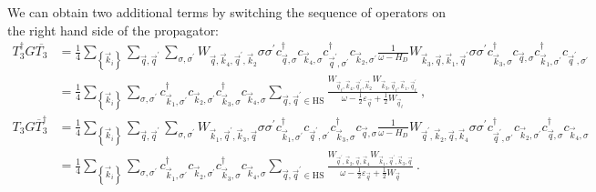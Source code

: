 \documentclass{revtex4-2}
\begin{document}
We can obtain two additional terms by switching the sequence of operators on the right hand side of the propagator:
\begin{equation}\begin{aligned}
	T_3^\dagger G \overline{T_3} &= \frac{1}{4}\sum_{\left\{ \vec k_i \right\} }\sum_{\vec q,\vec q^\prime}\sum_{\sigma,\sigma^\prime} W_{\vec q,\vec k_4, \vec q^\prime, \vec k_2} \sigma\sigma^\prime c^\dagger_{\vec q,\sigma}c_{\vec k_4,\sigma}c^\dagger_{\vec q^\prime,\sigma^\prime}c_{\vec k_2,\sigma^\prime} \frac{1}{\omega - H_D} W_{\vec k_3, \vec q, \vec k_1,\vec q^\prime} \sigma\sigma^\prime c^\dagger_{\vec k_3,\sigma} c_{\vec q,\sigma} c^\dagger_{\vec k_1,\sigma^\prime} c_{\vec q^\prime,\sigma^\prime}\\
			  &= \frac{1}{4}\sum_{\left\{ \vec k_i \right\}}\sum_{\sigma,\sigma^\prime} c^\dagger_{\vec k_1,\sigma^\prime} c_{\vec k_2,\sigma^\prime} c^\dagger_{\vec k_3,\sigma}c_{\vec k_4,\sigma}  \sum_{\vec q, \vec q^\prime \in \text{HS}}\frac{W_{\vec q_t,\vec k_4, \vec q_t^\prime, \vec k_2} W_{\vec k_3, \vec q_t, \vec k_1,\vec q_t^\prime}}{\omega - \frac{1}{2}\varepsilon_{\vec q} + \frac{1}{2}W_{\vec q_t}}~,
\end{aligned}\end{equation}
\begin{equation}\begin{aligned}
	T_3 G \overline T_3^\dagger &= \frac{1}{4}\sum_{\left\{ \vec k_i \right\} }\sum_{\vec q,\vec q^\prime}\sum_{\sigma,\sigma^\prime} W_{\vec k_1,\vec q^\prime, \vec k_3, \vec q} \sigma\sigma^\prime c^\dagger_{\vec k_1,\sigma^\prime} c_{\vec q^\prime,\sigma^\prime} c^\dagger_{\vec k_3,\sigma} c_{\vec q,\sigma} \frac{1}{\omega - H_D} W_{\vec q^\prime, \vec k_2, \vec q,\vec k_4} \sigma\sigma^\prime c^\dagger_{\vec q^\prime,\sigma^\prime}c_{\vec k_2,\sigma^\prime} c^\dagger_{\vec q,\sigma}c_{\vec k_4,\sigma}\\
			  &= \frac{1}{4}\sum_{\left\{ \vec k_i \right\}}\sum_{\sigma,\sigma^\prime} c^\dagger_{\vec k_1,\sigma^\prime} c_{\vec k_2,\sigma^\prime} c^\dagger_{\vec k_3,\sigma}c_{\vec k_4,\sigma}  \sum_{\vec q, \vec q^\prime \in \text{HS}}\frac{W_{\vec q^\prime, \vec k_2, \vec q,\vec k_4} W_{\vec k_1,\vec q^\prime, \vec k_3, \vec q}}{\omega - \frac{1}{2}\varepsilon_{\vec q} + \frac{1}{2}W_{\vec q}}~.
\end{aligned}\end{equation}
\end{document}
